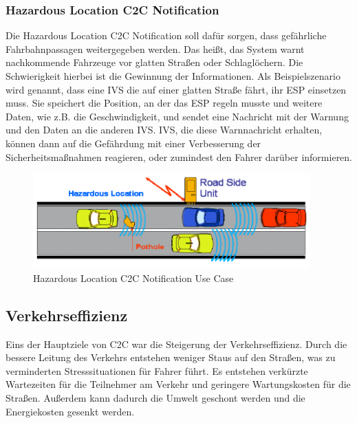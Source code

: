 \subsubsection{Hazardous Location C2C Notification}

Die Hazardous Location C2C Notification soll dafür sorgen, dass gefährliche Fahrbahnpassagen weitergegeben werden. Das heißt, das System warnt nachkommende Fahrzeuge vor glatten Straßen oder Schlaglöchern. Die Schwierigkeit hierbei ist die Gewinnung der Informationen. Als Beispielszenario wird genannt, dass eine \ac{IVS} die auf einer glatten Straße fährt, ihr ESP einsetzen muss. Sie speichert die Position, an der das ESP regeln musste und weitere Daten, wie z.B. die Geschwindigkeit, und sendet eine Nachricht mit der Warnung und den Daten an die anderen \ac{IVS}. \ac{IVS}, die diese Warnnachricht erhalten, können dann auf die Gefährdung mit einer Verbesserung der Sicherheitsmaßnahmen reagieren, oder zumindest den Fahrer darüber informieren. 

\begin{figure}[htbp]
\includegraphics[width=0.95\textwidth]{content/images/06_use_cases/hln.png}
\caption{Hazardous Location C2C Notification Use Case \cite{etsi102638}}
\label{fig:hln}
\end{figure}

\subsection{Verkehrseffizienz}
Eins der Hauptziele von \acl{C2C} war die Steigerung der Verkehrseffizienz. Durch die bessere Leitung des Verkehrs entstehen weniger Staus auf den Straßen, was zu verminderten Stresssituationen für Fahrer führt. Es entstehen verkürzte Wartezeiten für die Teilnehmer am Verkehr und geringere Wartungskosten für die Straßen. Außerdem kann dadurch die Umwelt geschont werden und die Energiekosten gesenkt werden. 

